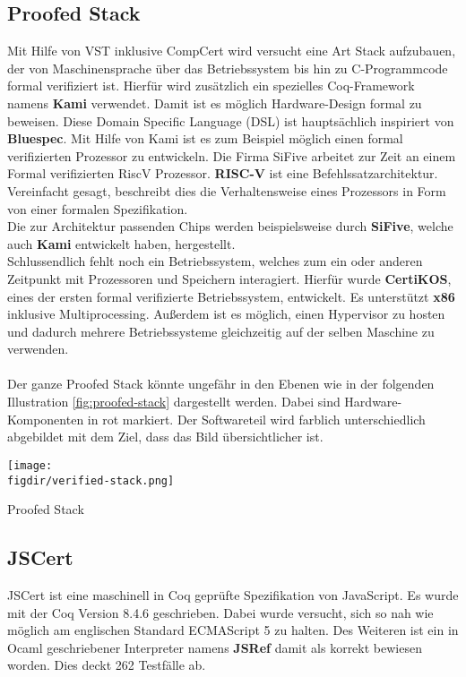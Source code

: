 \subsection{Proofed Stack}
Mit Hilfe von VST inklusive CompCert wird versucht eine Art Stack aufzubauen, der von Maschinensprache über das Betriebssystem bis hin zu C-Programmcode formal verifiziert ist. Hierfür wird zusätzlich ein spezielles Coq-Framework namens \textbf{Kami} verwendet. Damit ist es möglich Hardware-Design formal zu beweisen. Diese Domain Specific Language (DSL) ist hauptsächlich inspiriert von \textbf{Bluespec}. Mit Hilfe von Kami ist es zum Beispiel möglich einen formal verifizierten Prozessor zu entwickeln. Die Firma SiFive arbeitet zur Zeit an einem Formal verifizierten RiscV Prozessor. \textbf{RISC-V} ist eine Befehlssatzarchitektur.\cite{KAMI01:ST} Vereinfacht gesagt, beschreibt dies die Verhaltensweise eines Prozessors in Form von einer formalen Spezifikation.\\
Die zur Architektur passenden Chips werden beispielsweise durch \textbf{SiFive}, welche auch \textbf{Kami} entwickelt haben, hergestellt.\\
Schlussendlich fehlt noch ein Betriebssystem, welches zum ein oder anderen Zeitpunkt mit Prozessoren und Speichern interagiert. Hierfür wurde \textbf{CertiKOS}, eines der ersten formal verifizierte Betriebssystem, entwickelt. Es unterstützt \textbf{x86} inklusive Multiprocessing. Außerdem ist es möglich, einen Hypervisor zu hosten und dadurch mehrere Betriebssysteme gleichzeitig auf der selben Maschine zu verwenden.\cite{CERTIKOS01:FV}\cite{CERTIKOS02:FV}\\
\\
Der ganze Proofed Stack könnte ungefähr in den Ebenen wie in der folgenden Illustration \ref{fig:proofed-stack} dargestellt werden. Dabei sind Hardware-Komponenten in rot markiert. Der Softwareteil wird farblich unterschiedlich abgebildet mit dem Ziel, dass das Bild übersichtlicher ist.\\


\begin{minipage}{\textwidth}
	\centering
	\captionsetup{type=figure}
	\texttt{[image: \\figdir/verified-stack.png]}
	\caption{Proofed Stack}
	\label{fig:proofed-stack}
\end{minipage}


\subsection{JSCert}
JSCert ist eine maschinell in Coq geprüfte Spezifikation von JavaScript. Es wurde mit der Coq Version 8.4.6 geschrieben. Dabei wurde versucht, sich so nah wie möglich am englischen Standard ECMAScript 5 zu halten. Des Weiteren ist ein in Ocaml geschriebener Interpreter namens \textbf{JSRef} damit als korrekt bewiesen worden. Dies deckt 262 Testfälle ab.\cite{JSCERT01:FV}\cite{JSCERT012:FV}

